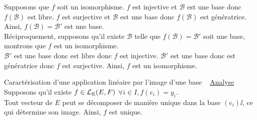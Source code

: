 \documentclass{article}
\renewenvironment{question_kholle}[2][ ]
{
	\subsection{\texorpdfstring{#2}{}}
	\notblank{#1}
	{
		\noindent #1
		\bigbreak
	}
	{}
	\begin{proof}
}
{
	\end{proof}
}
\begin{document}
\begin{question_kholle}
	Supposons que $f$ soit un isomorphisme. $f$ est injective et $\mathcal{B}$ est une base donc $f(\mathcal{B})$ est libre. $f$ est surjective et $\mathcal{B}$ est une base donc $f(\mathcal{B})$ est génératrice. Ainsi, $f(\mathcal{B})=\mathcal{B}'$ est une base. \\
	Réciproquement, supposons qu'il existe $\mathcal{B}$ telle que $f(\mathcal{B})=\mathcal{B}'$ soit une base, montrons que $f$ est un isomorphisme.\\
	$\mathcal{B}'$ est une base donc est libre donc $f$ est injective. $\mathcal{B}'$ est une base donc est génératrice donc $f$ est surjective.
	Ainsi, $f$ est un isomorphisme.
\end{question_kholle}

\begin{question_kholle}
	[Il existe une unique application linéaire de $E$ dans $F$ qui envoie une base donnée de $E$ sur une famille de $F$ imposée. \\
		Soient $(e_i)\ii$ une base de $E$ et $(y_i)\ii$ une famille de $F$.
		\begin{equation}
			\exists ! f \in \mathcal{L}_\K(E, F) : \forall i \in I, f(e_i) = y_i
		\end{equation}
		Nous pouvons expliciter une telle application :
		\begin{equation}
			f \left| \;\; \begin{matrix}
				E                                          & \rightarrow & F                                          \\
				\displaystyle \sum\ii \lambda_i \ldotp e_i & \mapsto     & \displaystyle \sum\ii \lambda_i \ldotp y_i
			\end{matrix} \right.
		\end{equation}]
	{Caractérisation d'une application linéaire par l'image d'une base}
	~\newline
	\underline{Analyse} Supposons qu'il existe $f \in \mathcal{L}_{\mathbb K}(E, F)$ \tq $\forall i \in I, f(e_i) = y_i$. \\
	Tout vecteur de $E$ peut se décomposer de manière unique dans la base $(e_i)\ii$, ce qui détermine son image. Ainsi, $f$ est unique.
	\newline


\end{question_kholle}
\end{document}
